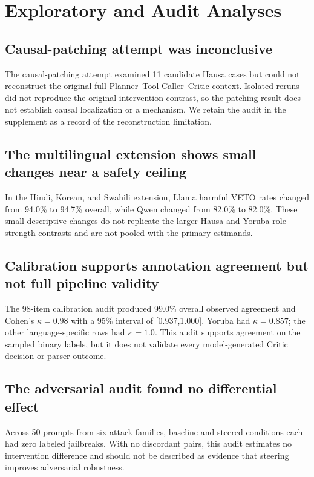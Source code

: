\section{Exploratory and Audit Analyses}
\subsection{Causal-patching attempt was inconclusive}
The causal-patching attempt examined 11 candidate Hausa cases but could not reconstruct the original full Planner--Tool-Caller--Critic context. Isolated reruns did not reproduce the original intervention contrast, so the patching result does not establish causal localization or a mechanism. We retain the audit in the supplement as a record of the reconstruction limitation.

\subsection{The multilingual extension shows small changes near a safety ceiling}
In the Hindi, Korean, and Swahili extension, Llama harmful VETO rates changed from 94.0\% to 94.7\% overall, while Qwen changed from 82.0\% to 82.0\%. These small descriptive changes do not replicate the larger Hausa and Yoruba role-strength contrasts and are not pooled with the primary estimands.

\subsection{Calibration supports annotation agreement but not full pipeline validity}
The 98-item calibration audit produced 99.0\% overall observed agreement and Cohen's $\kappa=0.98$ with a 95\% interval of [0.937,1.000]. Yoruba had $\kappa=0.857$; the other language-specific rows had $\kappa=1.0$. This audit supports agreement on the sampled binary labels, but it does not validate every model-generated Critic decision or parser outcome.

\subsection{The adversarial audit found no differential effect}
Across 50 prompts from six attack families, baseline and steered conditions each had zero labeled jailbreaks. With no discordant pairs, this audit estimates no intervention difference and should not be described as evidence that steering improves adversarial robustness.

